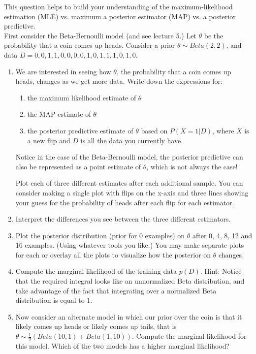 \documentclass[submit]{harvardml}
\begin{document}
\newpage
\begin{problem}

  This question helps to build your understanding of the
  maximum-likelihood estimation (MLE) vs. maximum a posterior
  estimator (MAP) vs. a posterior predictive.\\

  First consider the Beta-Bernoulli model (and see lecture 5.)  Let
  $\theta$ be the probability that a coin comes up heads.  Consider a
  prior $\theta\sim Beta(2,2)$, and data $D= 0, 0, 1, 1, 0, 0, 0, 0,
  1, 0, 1, 1, 1, 0, 1, 0$.

%
\begin{enumerate}

\item 
We are interested in seeing how $\theta$, the probability that a coin comes up heads, changes as we get more data.
 Write down the expressions for: 
 \begin{enumerate}
     \item the maximum likelihood estimate of $\theta$
     \item the MAP estimate of $\theta$
     \item the posterior predictive estimate of $\theta$ based on $P(X = 1 | D)$, where $X$ is a new flip and $D$ is all the data you currently have.
 \end{enumerate} 
 Notice in the case of the Beta-Bernoulli model, the posterior predictive can also be represented as a point estimate of $\theta$, which is not always the case! 
 
 Plot each of three different estimates after each
  additional sample.  You can consider making a single plot with
  flips on the x-axis and three lines showing your guess for the
  probability of heads after each flip for each estimator.

%
\item Interpret the differences you see between the three different
estimators.
% 
\item Plot the posterior distribution (prior for 0 examples) on $\theta$ after 0, 4, 8, 12 and 16 examples. (Using whatever tools you like.)  You may make separate plots for each or overlay all the plots to visualize how the posterior on $\theta$ changes.
%

\item Compute the marginal likelihood of the training data $p(D)$.
  Hint: Notice that the required integral looks like an unnormalized
  Beta distribution, and take advantage of the fact that integrating
  over a normalized Beta distribution is equal to 1.
\item Now consider an alternate model in which our prior over the coin
  is that it likely comes up heads or likely comes up tails, that is
  $\theta \sim \frac{1}{2}( Beta(10,1) + Beta(1,10) )$.  Compute the marginal
  likelihood for this model.  Which of the two models has a higher
  marginal likelihood?
\end{enumerate}
 \end{problem}
\end{document}
